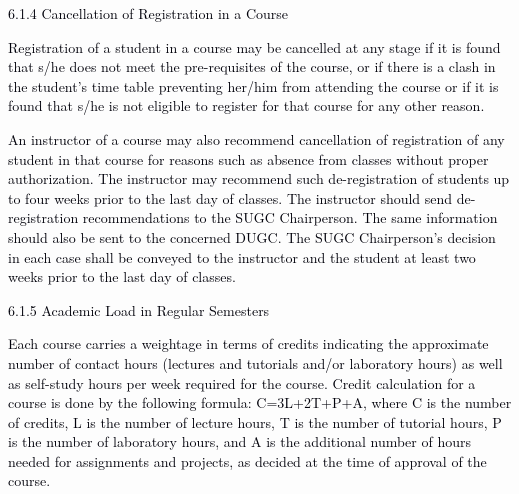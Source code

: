 \documentclass[12pt]{article}
\begin{document}
\vspace{\baselineskip}
{\fontsize{10pt}{12.0pt}\selectfont \textcolor[HTML]{00000A}{6.1.4 Cancellation of Registration in a Course}\par}\par


\vspace{\baselineskip}
\begin{adjustwidth}{0.0in}{0.07in}
\begin{justify}
{\fontsize{10pt}{12.0pt}\selectfont \textcolor[HTML]{00000A}{Registration of a student in a course may be cancelled at any stage if it is found that s/he does not meet the pre-requisites of the course, or if there is a clash in the student's time table preventing her/him from attending the course or if it is found that s/he is not eligible to register for that course for any other reason.}\par}
\end{justify}\par

\end{adjustwidth}


\vspace{\baselineskip}
\begin{justify}
{\fontsize{9pt}{10.8pt}\selectfont \textcolor[HTML]{00000A}{An instructor of a course may also recommend cancellation of registration of any student in that course for reasons such as absence from classes without proper authorization. The instructor may recommend such de-registration of students up to four weeks prior to the last day of classes. The instructor should send de-registration recommendations to the SUGC Chairperson. The same information should also be sent to the concerned DUGC. The SUGC Chairperson's decision in each case shall be conveyed to the instructor and the student at least two weeks prior to the last day of classes.}\par}
\end{justify}\par


\vspace{\baselineskip}
{\fontsize{10pt}{12.0pt}\selectfont \textcolor[HTML]{00000A}{6.1.5 Academic Load in Regular Semesters}\par}\par


\vspace{\baselineskip}
\begin{justify}
{\fontsize{10pt}{12.0pt}\selectfont \textcolor[HTML]{00000A}{Each course carries a weightage in terms of credits indicating the approximate number of contact hours (lectures and tutorials and/or laboratory hours) as well as self-study hours per week required for the course. Credit calculation for a course is done by the following formula: C=3L+2T+P+A, where C is the number of credits, L is the number of lecture hours, T is the number of tutorial hours, P is the number of laboratory hours, and A is the additional number of hours needed for assignments and projects, as decided at the time of approval of the course.}\par}
\end{justify}\par
\end{document}
